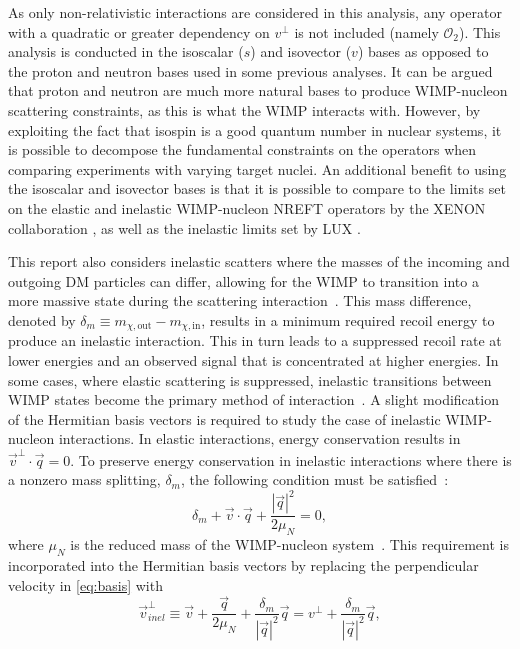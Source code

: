 \documentclass[reprint, showpacs,
preprintnumbers,
amsmath,amssymb,
aps, floatfix,
superscriptaddress,
prd, nofootinbib]{revtex4-1}
\begin{document}
As only non-relativistic interactions are considered in this analysis, any operator with a quadratic or greater dependency on $v^{\perp}$ is not included (namely $\mathcal{O}_2$). 
This analysis is conducted in the isoscalar ($s$) and isovector ($v$) bases as opposed to the proton and neutron bases used in some previous analyses. 
It can be argued that proton and neutron are much more natural bases to produce WIMP-nucleon scattering constraints, as this is what the WIMP interacts with.
However, by exploiting the fact that isospin is a good quantum number in nuclear systems, it is possible to decompose the fundamental constraints on the operators when comparing experiments with varying target nuclei.
An additional benefit to using the isoscalar and isovector bases is that it is possible to compare to the limits set on the elastic and inelastic WIMP-nucleon NREFT operators by the XENON collaboration \cite{Xenon100:EFT_2017}, as well as the inelastic limits set by LUX \cite{LUX:EFTR4_2021}.
\par
This report also considers inelastic scatters where the masses of the incoming and outgoing DM particles can differ, allowing for the WIMP to transition into a more massive state during the scattering interaction~\cite{Smith_2001}. 
This mass difference, denoted by $\delta_m \equiv m_{\chi,\mathrm{out}} - m_{\chi,\mathrm{in}}$, results in a minimum required recoil energy to produce an inelastic interaction. This in turn leads to a suppressed recoil rate at lower energies and an observed signal that is concentrated at higher energies. 
In some cases, where elastic scattering is suppressed, inelastic transitions between WIMP states become the primary method of interaction~\cite{Han_1997, Hall_1998}.
A slight modification of the Hermitian basis vectors is required to study the case of inelastic WIMP-nucleon interactions. 
In elastic interactions, energy conservation results in $\vec{v}^{\perp} \cdot \vec{q} = 0$. To preserve energy conservation in inelastic interactions where there is a nonzero mass splitting, $\delta_m$, the following condition must be satisfied~\cite{Barello_2014}:
\begin{equation}\label{eq:massSplitting} 
\delta_m + \vec{v} \cdot \vec{q} +\frac{|\vec{q}|^2}{2\mu_N }= 0, 
\end{equation}
where $\mu_N$ is the reduced mass of the WIMP-nucleon system~\cite{Barello_2014}. 
This requirement is incorporated into the Hermitian basis vectors by replacing the perpendicular velocity in \autoref{eq:basis} with
\begin{equation}\label{eq:idmVelocity} 
\vec{v}^\perp_{inel} \equiv \vec{v} + \frac{\vec{q}}{2\mu_N} + \frac{\delta_m}{|\vec{q}|^2}\vec{q} =v^\perp + \frac{\delta_m}{|\vec{q}|^2}\vec{q}, 
\end{equation}
\end{document}
